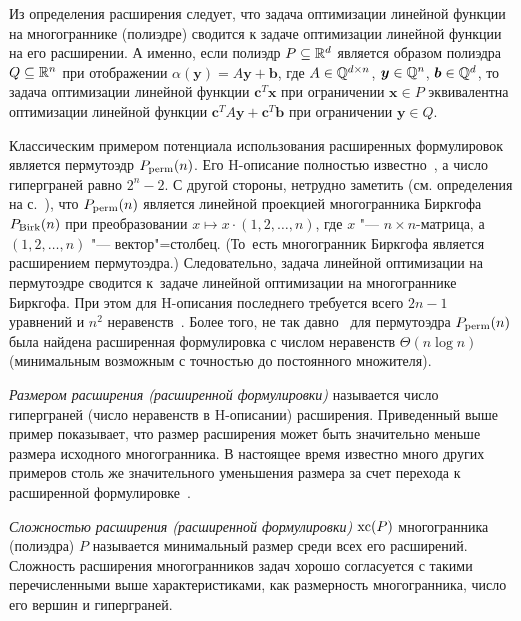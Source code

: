 Из определения расширения следует, что задача оптимизации линейной функции на многограннике (полиэдре) сводится к задаче оптимизации линейной функции на его расширении.
А именно, если полиэдр $P\subseteq \mathbb{R}^d$ является образом полиэдра $Q\subseteq \mathbb{R}^n$ при отображении $\alpha(\bm{y}) = A \bm{y} + \bm{b}$, где $A \in \mathbb{Q}^{d\times n}$, $\bm{y} \in \mathbb{Q}^n$, $\bm{b} \in \mathbb{Q}^d$,
то задача оптимизации линейной функции $\bm{c}^T \bm{x}$ при ограничении $\bm{x} \in P$
эквивалентна оптимизации линейной функции $\bm{c}^T A \bm{y} + \bm{c}^T \bm{b}$ при ограничении $\bm{y} \in Q$.

Классическим примером потенциала использования расширенных формулировок является пермутоэдр $P_{\textup{perm}}(n)$.\label{Perm2Birk}
Его H-описание полностью известно~\cite{Rado:1952,ZieglerBook},
а число гиперграней равно $2^n-2$.
С другой стороны, нетрудно заметить (см. определения на с.~\pageref{def:perm-birk}), что $P_{\textup{perm}}(n)$ является линейной проекцией многогранника Биркгофа $P_{\textup{Birk}}(n)$ при преобразовании $x \mapsto x \cdot (1,2,\dots,n)$, где $x$ "--- $n \times n$-матрица, а $(1,2,\dots,n)$ "--- вектор"=столбец.
(То~есть многогранник Биркгофа является расширением пермутоэдра.)
Следовательно, 
задача линейной оптимизации на пермутоэдре сводится к~задаче линейной оптимизации на многограннике Биркгофа.
При этом для H-описания последнего требуется всего $2n-1$ уравнений и $n^2$ неравенств~\cite{Birkhoff:1946}.
Более того, не так давно~\cite{Goemans:2015} для пермутоэдра $P_{\textup{perm}}(n)$ была найдена расширенная формулировка с числом неравенств $\Theta(n \log n)$ (минимальным возможным с точностью до постоянного множителя).

\emph{Размером расширения (расширенной формулировки)}
называется число гиперграней (число неравенств в H-описании) расширения.
Приведенный выше пример показывает, что размер расширения может быть значительно меньше размера исходного многогранника. 
В настоящее время известно много других примеров столь же значительного уменьшения размера за счет перехода к расширенной формулировке~\cite{Kaibel:2011, Conforti:2013}.

\emph{Сложностью расширения (расширенной формулировки)} $\operatorname{xc}(P)$ многогранника (полиэдра) $P$ называется минимальный размер среди всех его расширений.
Сложность расширения многогранников задач хорошо согласуется с такими перечисленными выше характеристиками, как размерность многогранника, число его вершин и гиперграней.

